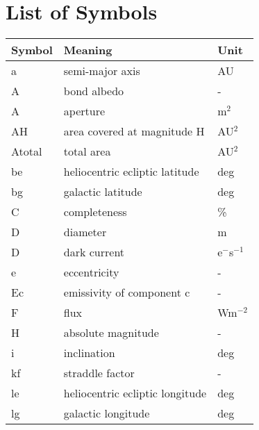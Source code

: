 \listoffigures
\listoftables

\chapter*{List of Symbols}

\begin{table}[h!]
\centering
\begin{tabular}{l|l|l}
\textbf{Symbol} & \textbf{Meaning}                         & \textbf{Unit} \\ \hline
a               & semi-major axis                          & AU            \\
A               & bond albedo                              & -             \\
A               & aperture                                 & m$^2$            \\
AH              & area covered at magnitude H              & AU$^2$           \\
Atotal          & total area                               & AU$^2$           \\
be              & heliocentric ecliptic latitude           & deg           \\
bg              & galactic latitude                        & deg           \\
C               & completeness                             & \%            \\
D               & diameter                                 & m             \\
D               & dark current                             & e$^-$s$^{-1}$          \\
e               & eccentricity                             & -             \\
Ec              & emissivity of component c                & -             \\
F               & flux                                     & Wm$^{-2}$          \\
H               & absolute magnitude                       & -             \\
i               & inclination                              & deg           \\
kf              & straddle factor                          & -             \\
le              & heliocentric ecliptic longitude          & deg           \\
lg              & galactic longitude                       & deg           \\

\end{tabular}
\end{table}
